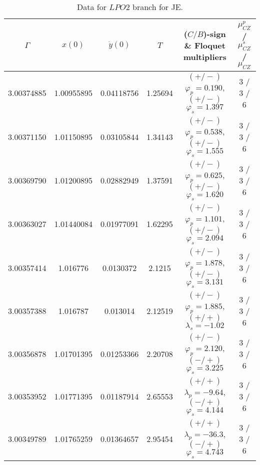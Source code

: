 \documentclass[reqno, 11pt]{amsart}
\theoremstyle{plain}
\theoremstyle{definition}
\theoremstyle{remark}
\begin{document}
\begin{table}[h]\fontsize{10}{10}\selectfont \centering
\caption{Data for $LPO2$ branch for JE.}
	\begin{tabular}{c|c|c|c|c|c}
 \hline
		$\Gamma$ & $x(0)$ & $\dot{y}(0)$ & $T$ & ($C/B$)-sign \& Floquet multipliers & $\mu_{CZ}^p$ / $\mu_{CZ}^s$ / $\mu_{CZ}$\\
		\hline 3.00374885 & 1.00955895 & 0.04118756 & 1.25694 & $(+/-)$ $\varphi_p = 0.190$, $(+/-)$ $\varphi_s = 1.397$ & 3 / 3 / 6\\
		3.00371150 & 1.01150895 & 0.03105844 & 1.34143 & $(+/-)$ $\varphi_p = 0.538$, $(+/-)$ $\varphi_s = 1.555$ & 3 / 3 / 6 \\
		3.00369790 & 1.01200895 & 0.02882949 & 1.37591 &  $(+/-)$ $\varphi_p = 0.625$, $(+/-)$ $\varphi_s = 1.620$ & 3 / 3 / 6 \\
		3.00363027 & 1.01440084 & 0.01977091 & 1.62295 & $(+/-)$ $\varphi_p = 1.101$, $(+/-)$ $\varphi_s = 2.094$ & 3 / 3 / 6 \\
		3.00357414 & 1.016776 & 0.0130372 & 2.1215 & $(+/-)$ $\varphi_p = 1.878$, $(+/-)$ $\varphi_s = 3.131$ & 3 / 3 / 6 \\
		3.00357388 & 1.016787 & 0.013014 & 2.12519 & $(+/-)$ $\varphi_p = 1.885$, $(+/+)$ $\lambda_s = -1.02$ & 3 / 3 / 6 \\
		3.00356878 & 1.01701395 & 0.01253366 & 2.20708 & $(+/-)$ $\varphi_p = 2.120$, $(-/+)$ $\varphi_s = 3.225$ & 3 / 3 / 6 \\
		3.00353952 & 1.01771395 & 0.01187914 & 2.65553 & $(+/+)$ $\lambda_p = -9.64$, $(-/+)$ $\varphi_s = 4.144$ & 3 / 3 / 6 \\
		3.00349789 & 1.01765259 & 0.01364657 & 2.95454 & $(+/+)$ $\lambda_p = -36.3$, $(-/+)$ $\varphi_s = 4.743$ & 3 / 3 / 6 
	\end{tabular}
	\label{data_lpo2}
\end{table}
\end{document}
